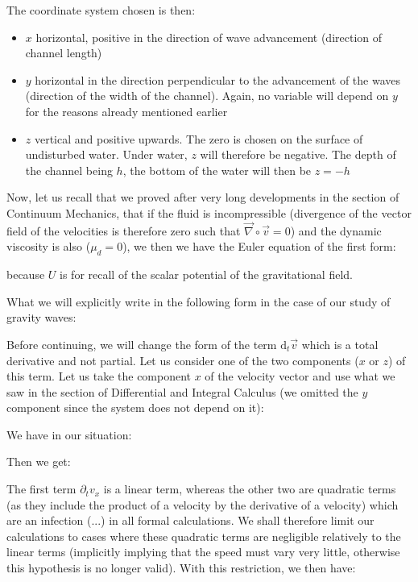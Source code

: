 	The coordinate system chosen is then:
	\begin{itemize}
		\item $x$ horizontal, positive in the direction of wave advancement (direction of channel length)

		\item $y$ horizontal in the direction perpendicular to the advancement of the waves (direction of the width of the channel). Again, no variable will depend on $y$ for the reasons already mentioned earlier

		\item $z$ vertical and positive upwards. The zero is chosen on the surface of undisturbed water. Under water, $z$ will therefore be negative. The depth of the channel being $h$, the bottom of the water will then be $z=-h$
	\end{itemize}
	Now, let us recall that we proved after very long developments in the section of Continuum Mechanics, that if the fluid is incompressible (divergence of the vector field of the velocities is therefore zero such that $\vec{\nabla}\circ\vec{v}=0$) and the dynamic viscosity is also ($\mu_d=0$), we then we have the Euler equation of the first form:
	
	because $U$ is for recall of the scalar potential of the gravitational field.

	What we will explicitly write in the following form in the case of our study of gravity waves:
	
	Before continuing, we will change the form of the term $\mathrm{d}_t\vec{v}$ which is a total derivative and not partial. Let us consider one of the two components ($x$ or $z$) of this term. Let us take the component $x$ of the velocity vector and use what we saw in the section of Differential and Integral Calculus (we omitted the $y$ component since the system does not depend on it):
	
	We have in our situation:
	
	Then we get:
	
	The first term $\partial_t v_x$ is a linear term, whereas the other two are quadratic terms (as they include the product of a velocity by the derivative of a velocity) which are an infection (...) in all formal calculations. We shall therefore limit our calculations to cases where these quadratic terms are negligible relatively to the linear terms (implicitly implying that the speed must vary very little, otherwise this hypothesis is no longer valid). With this restriction, we then have:
	
